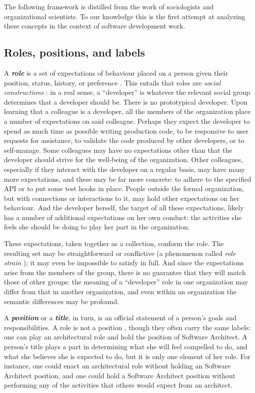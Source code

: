 \documentclass[10pt, conference, compsocconf]{IEEEtran}
\begin{document}
The following framework is distilled from the work of sociologists and organizational scientists. To our knowledge this is the first attempt at analyzing these concepts in the context of software development work.


\subsection{Roles, positions, and labels}

A \textbf{\emph{role}} is a set of expectations of behaviour placed on a person given their position, status, history, or preference \cite{Turner1956,Gordon1976,Rizzo1970}. This entails that roles are \emph{social constructions} \cite{Berger1967}: in a real sense, a ``developer'' is whatever the relevant social group determines that a developer should be. There is no prototypical developer. Upon learning that a colleague is a developer, all the members of the organization place a number of expectations on said colleague. Perhaps they expect the developer to spend as much time as possible writing production code, to be responsive to user requests for assistance, to validate the code produced by other developers, or to self-manage. Some colleagues may have no expectations other than that the developer should strive for the well-being of the organization. Other colleagues, especially if they interact with the developer on a regular basis, may have many more expectations, and these may be far more concrete: to adhere to the specified API or to put some test hooks in place. People outside the formal organization, but with connections or interactions to it, may hold other expectations on her behaviour. And the developer herself, the target of all these expectations, likely has a number of additional expectations on her own conduct: the activities she feels she should be doing to play her part in the organization.

These expectations, taken together as a collection, conform the role. The resulting set may be straightforward or conflictive (a phenomenon called \emph{role strain} \cite{Goode1960}); it may even be impossible to satisfy in full. And since the expectations arise from the members of the group, there is no guarantee that they will match those of other groups: the meaning of a ``developer'' role in one organization may differ from that in another organization, and even within an organization the semantic differences may be profound.

A \textbf{\emph{position}} or a \textbf{\emph{title}}, in turn, is an official statement of a person's goals and responsibilities. A role is not a position \cite{Turner1956}, though they often carry the same labels: one can play an architectural role and hold the position of Software Architect. A person's title plays a part in determining what she will feel compelled to do, and what she believes she is expected to do, but it is only one element of her role. For instance, one could enact an architectural role without holding an Software Architect position, and one could hold a Software Architect position without performing any of the activities that others would expect from an architect.
\end{document}
